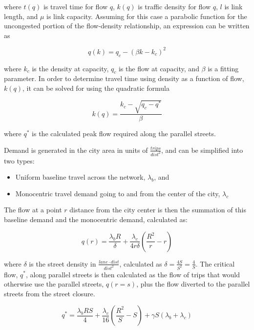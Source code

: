 \documentclass{article}
\begin{document}
\noindent where $t(q)$ is travel time for flow $q$, $k(q)$ is traffic density for flow $q$, $l$ is link length, and $\mu$ is link capacity. Assuming for this case a parabolic function for the uncongested portion of the flow-density relationship, an expression can be written as

\begin{equation}
    q(k) = q_c - (\beta k - k_c)^2
\end{equation}

\noindent where $k_c$ is the density at capacity, $q_c$ is the flow at capacity, and $\beta$ is a fitting parameter. In order to determine travel time using density as a function of flow, $k(q)$, it can be solved for using the quadratic formula

\begin{equation}
    k(q) = \frac{k_c - \sqrt{q_c - q^*}}{\beta}
\end{equation}

\noindent where $q^*$ is the calculated peak flow required along the parallel streets.

Demand is generated in the city area in units of $\frac{trips}{dist^2}$, and can be simplified into two types: 

\begin{itemize}[topsep=3pt, itemsep=3pt, partopsep=3pt, parsep=3pt]
    \item Uniform baseline travel across the network, $\lambda_b$, and
    \item Monocentric travel demand going to and from the center of the city, $\lambda_c$
\end{itemize}

The flow at a point $r$ distance from the city center is then the summation of this baseline demand and the monocentric demand, calculated as:

\begin{equation}
    q(r) = \frac{\lambda_b R}{\delta} + \frac{\lambda_c}{4r\delta} \left( \frac{R^2}{r} - r \right)
\end{equation}

\noindent where $\delta$ is the street density in $\frac{lane \cdot dist}{dist^2}$, calculated as $\delta = \frac{4S}{S^2} = \frac{4}{S}$. The critical flow, $q^*$, along parallel streets is then calculated as the flow of trips that would otherwise use the parallel streets, $q(r=s)$, plus the flow diverted to the parallel streets from the street closure.

\begin{equation}
    q^* = \frac{\lambda_b R S}{4} + \frac{\lambda_c}{16} \left( \frac{R^2}{S} - S \right) + \gamma S (\lambda_b + \lambda_c)
\end{equation}
\end{document}
